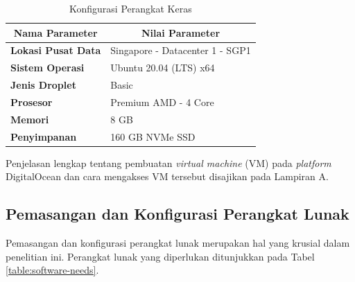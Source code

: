 \begin{table}
	\centering
	\caption{Konfigurasi Perangkat Keras}
	\begin{tabular}{|ll|}
		\hline
		\multicolumn{1}{|c|}{\textbf{Nama Parameter}}    & \multicolumn{1}{c|}{\textbf{Nilai Parameter}} \\ \hline
		\multicolumn{1}{|l|}{\textbf{Lokasi Pusat Data}} & Singapore - Datacenter 1 - SGP1               \\ \hline
		\multicolumn{1}{|l|}{\textbf{Sistem Operasi}}    & Ubuntu 20.04 (LTS) x64                        \\ \hline
		\multicolumn{1}{|l|}{\textbf{Jenis Droplet}}     & Basic                                         \\ \hline
		\multicolumn{1}{|l|}{\textbf{Prosesor}}          & Premium AMD - 4 Core                          \\ \hline
		\multicolumn{1}{|l|}{\textbf{Memori}}            & 8 GB                                          \\ \hline
		\multicolumn{1}{|l|}{\textbf{Penyimpanan}}       & 160 GB NVMe SSD                               \\ \hline
	\end{tabular}
	\label{table:conf-hardware}
\end{table}

Penjelasan lengkap tentang pembuatan \textit{virtual machine} (VM) pada \textit{platform} DigitalOcean dan cara mengakses VM tersebut disajikan pada Lampiran A.

\subsection{Pemasangan dan Konfigurasi Perangkat Lunak}
Pemasangan dan konfigurasi perangkat lunak merupakan hal yang krusial dalam penelitian ini. Perangkat lunak yang diperlukan ditunjukkan pada Tabel \ref{table:software-needs}.

